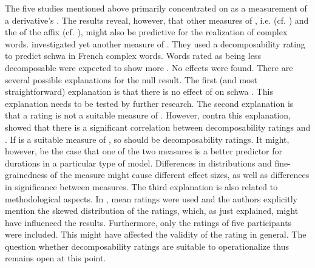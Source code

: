 {{The five studies mentioned above primarily concentrated on  as a measurement of a derivative's . The results reveal, however, that other measures of , i.e.  (cf. \citealt{Hanique.2011}) and the  of the affix (cf. \citealt{Hay.2007}), might also be predictive for the realization of complex words.  
\cite{Burki.2011} investigated yet another measure of . They used a decomposability rating to predict schwa  in French complex words. Words rated as being less decomposable were expected to show more . No effects were found. There are several possible explanations for the null result. 
The first (and most straightforward) explanation is that there is no effect of  on schwa . This explanation needs to be tested by further research. 
The second explanation is that a rating is not a suitable measure of . However, contra this explanation, \cite{Hay.2001,Hay.2003} showed that there is a significant correlation between decomposability ratings and . If  is a suitable measure of , so should be decomposability ratings. It might, however, be the case that one of the two measures is a better predictor for durations in a particular type of model.  Differences in distributions and fine-grainedness of the measure might cause different effect sizes, as well as differences in significance between measures.   
The third explanation is also related to methodological aspects. In \cite{Burki.2011}, mean ratings were used and the authors explicitly mention the skewed distribution of the ratings, which, as just explained, might have influenced the results. Furthermore, only the ratings of five participants were included. This might have affected the validity of the rating in general. 
The question whether decomposability ratings are suitable to operationalize  thus remains open at this point.


}}
